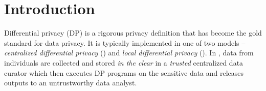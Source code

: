 \section{Introduction}
Differential privacy (DP) is a rigorous privacy definition that has become the gold standard for data privacy. %
It is typically implemented in one of two models -- \textit{centralized differential privacy} (\cdp) and \textit{local differential privacy} (\ldp). In \cdp, data from individuals are collected and stored \textit{in the clear} in a \textit{trusted} centralized data curator which then executes DP programs on the sensitive data  and releases outputs to an untrustworthy data analyst. %

